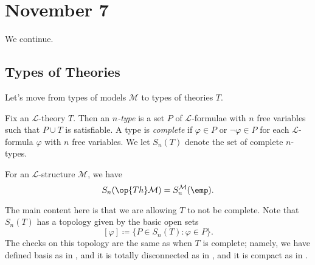 \documentclass[../notes.tex]{subfiles}
\begin{document}
\section{November 7}

We continue.

\subsection{Types of Theories}
Let's move from types of models $\mathcal M$ to types of theories $T$.
\begin{definition}[type]
	Fix an $\mathcal L$-theory $T$. Then an \textit{$n$-type} is a set $P$ of $\mathcal L$-formulae with $n$ free variables such that $P\cup T$ is satisfiable. A type is \textit{complete} if $\varphi\in P$ or $\lnot\varphi\in P$ for each $\mathcal L$-formula $\varphi$ with $n$ free variables. We let $S_n(T)$ denote the set of complete $n$-types.
\end{definition}
\begin{example}
	For an $\mathcal L$-structure $\mathcal M$, we have
	\[S_n(\op{Th}\mathcal M)=S_n^{\mathcal M}(\emp).\]
\end{example}
The main content here is that we are allowing $T$ to not be complete. Note that $S_n(T)$ has a topology given by the basic open sets
\[[\varphi]\coloneqq\{P\in S_n(T):\varphi\in P\}.\]
The checks on this topology are the same as when $T$ is complete; namely, we have defined basis as in , and it is totally disconnected as in , and it is compact as in .
\end{document}
